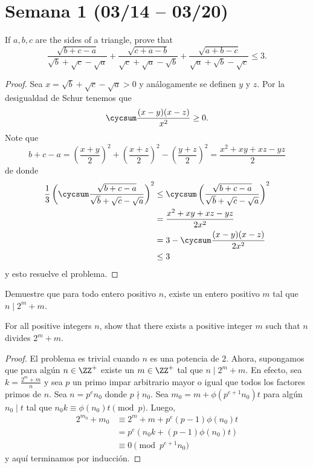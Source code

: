 \section{Semana 1 (03/14 -- 03/20)}


\begin{probEG}[ISL 2006/A5]
	If $a,b,c$ are the sides of a triangle, prove that
	\[\frac{\sqrt{b+c-a}}{\sqrt b+\sqrt c-\sqrt a}+\frac{\sqrt{c+a-b}}{\sqrt c+\sqrt a-\sqrt b}+\frac{\sqrt{a+b-c}}{\sqrt a+\sqrt b-\sqrt c}\le 3.\]
\end{probEG}

\begin{proof}
	Sea $x=\sqrt b+\sqrt c-\sqrt a>0$ y análogamente se definen $y$ y $z$. Por la desigualdad de Schur tenemos que
	\[\cycsum\frac{(x-y)(x-z)}{x^2}\ge 0.\]
	Note que
	\[b+c-a=\left(\frac{x+y}{2}\right)^2+\left(\frac{x+z}{2}\right)^2-\left(\frac{y+z}{2}\right)^2=\frac{x^2+xy+xz-yz}{2}\]
	de donde
	\begin{align*}
		\frac13\left(\cycsum\frac{\sqrt{b+c-a}}{\sqrt b+\sqrt c-\sqrt a}\right)^2
		&\le\cycsum\left(\frac{\sqrt{b+c-a}}{\sqrt b+\sqrt c-\sqrt a}\right)^2\\
		&=\frac{x^2+xy+xz-yz}{2x^2}\\
		&=3-\cycsum\frac{(x-y)(x-z)}{2x^2}\\
		&\le 3
	\end{align*}
	y esto resuelve el problema.
\end{proof}

\begin{probEB}[ISL 2006/N7]
	Demuestre que para todo entero positivo $n$, existe un entero positivo $m$ tal que $n\mid 2^m+m$.
	\begin{hint}
		For all positive integers $n$, show that there exists a positive integer $m$ such that $n$ divides $2^m+m$.
	\end{hint}
\end{probEB}

\begin{proof}
	El problema es trivial cuando $n$ es una potencia de $2$. Ahora, supongamos que para algún $n\in\ZZ^+$ existe un $m\in\ZZ^+$ tal que $n\mid 2^m+m$. En efecto, sea $k=\frac{2^m+m}{n}$ y sea $p$ un primo impar arbitrario mayor o igual que todos los factores primos de $n$. Sea $n=p^en_0$ donde $p\nmid n_0$. Sea $m_0=m+\phi(p^{e+1}n_0)t$ para algún $n_0\mid t$ tal que $n_0k\equiv\phi(n_0)t\pmod p$. Luego,
	\begin{align*}
		2^{m_0}+m_0
		&\equiv 2^m+m+p^e(p-1)\phi(n_0)t\\
		&=p^e\left(n_0k+(p-1)\phi(n_0)t\right)\\
		&\equiv 0\pmod{p^{e+1}n_0}
	\end{align*}
	y aquí terminamos por inducción.
\end{proof}

